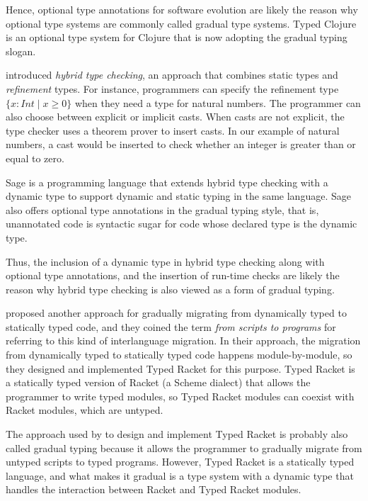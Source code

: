 Hence, optional type annotations for software evolution are likely
the reason why optional type systems are commonly called
gradual type systems.
Typed Clojure \citep{bonnaire-sergeant2012typed-clojure} is an
optional type system for Clojure that is now adopting the
gradual typing slogan.

\citet{flanagan2006htc} introduced \emph{hybrid type checking},
an approach that combines static types and \emph{refinement} types.
For instance, programmers can specify the refinement type
$\{x:Int \;|\; x \ge 0\}$ when they need a type for natural numbers.
The programmer can also choose between explicit or implicit casts.
When casts are not explicit, the type checker uses a theorem prover
to insert casts.
In our example of natural numbers, a cast would be inserted to check
whether an integer is greater than or equal to zero.

Sage \citep{gronski2006sage} is a programming language that
extends hybrid type checking with a dynamic type to
support dynamic and static typing in the same language.
Sage also offers optional type annotations in the gradual typing
style, that is, unannotated code is syntactic sugar for
code whose declared type is the dynamic type.

Thus, the inclusion of a dynamic type in hybrid type checking
along with optional type annotations, and the insertion of run-time
checks are likely the reason why hybrid type checking is
also viewed as a form of gradual typing.

\citet{tobin-hochstadt2006ims} proposed another approach for gradually
migrating from dynamically typed to statically typed code,
and they coined the term \emph{from scripts to programs} for
referring to this kind of interlanguage migration.
In their approach, the migration from dynamically typed to
statically typed code happens module-by-module, so they designed
and implemented Typed Racket \citep{tobin-hochstadt2008ts} for
this purpose.
Typed Racket is a statically typed version of Racket
(a Scheme dialect) that allows the programmer to write typed modules,
so Typed Racket modules can coexist with Racket modules,
which are untyped.

The approach used by \citet{tobin-hochstadt2008ts} to design and
implement Typed Racket is probably also called gradual typing
because it allows the programmer to gradually migrate from untyped
scripts to typed programs.
However, Typed Racket is a statically typed language,
and what makes it gradual is a type system with a dynamic type
that handles the interaction between Racket and Typed Racket modules.

